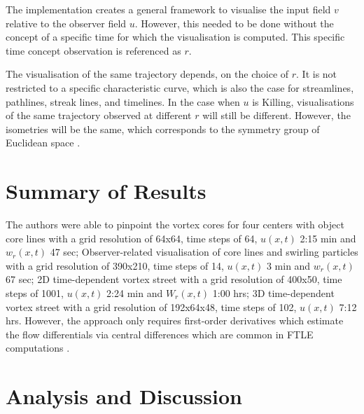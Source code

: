 \documentclass[a4paper,9pt]{article}
\begin{document}
The implementation creates a general framework to visualise the input field $v$ relative to the observer field $u$. However, this needed to be done without the concept of a specific time for which the visualisation is computed. This specific time concept observation is referenced as $r$. 

The visualisation of the same trajectory depends, on the choice of $r$. It is not restricted to a specific characteristic curve, which is also the case for streamlines, pathlines, streak lines, and timelines. In the case when $u$ is Killing, visualisations of the same trajectory observed at different $r$ will still be different. However, the isometries will be the same, which corresponds to the symmetry group of Euclidean space \cite{25}. 


\section{Summary of Results}

The authors were able to pinpoint the vortex cores for four centers with object core lines with a grid resolution of 64x64, time steps of 64, $u(x,t)$ 2:15 min and $w_r(x,t)$ 47 sec; Observer-related visualisation of core lines and swirling particles with a grid resolution of 390x210, time steps of 14, $u(x,t)$ 3 min and $w_r(x,t)$ 67 sec; 2D time-dependent vortex street with a grid resolution of 400x50, time steps of 1001, $u(x,t)$ 2:24 min and $W_r(x,t)$ 1:00 hrs; 3D time-dependent vortex street with a grid resolution of 192x64x48, time steps of 102, $u(x,t)$ 7:12 hrs. However, the approach only requires first-order derivatives which estimate the flow differentials via central differences which are common in FTLE computations \cite{40}.


\section{Analysis and Discussion}
\end{document}
